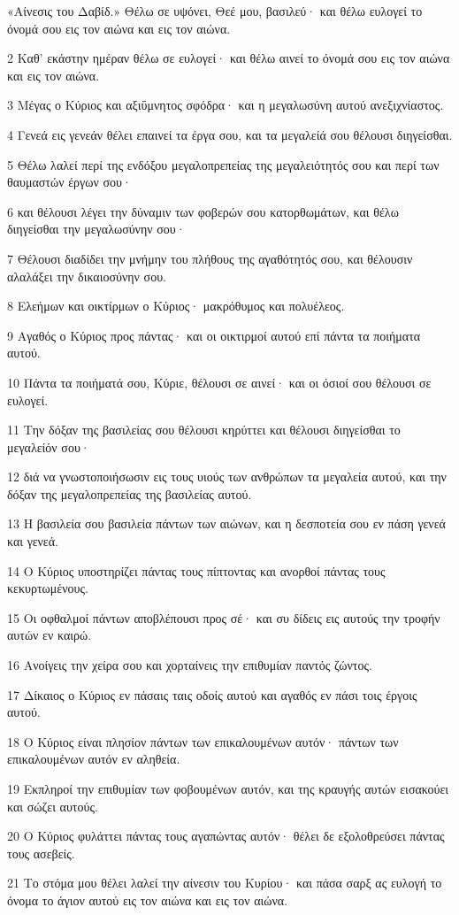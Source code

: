 \par «Αίνεσις του Δαβίδ.» Θέλω σε υψόνει, Θεέ μου, βασιλεύ· και θέλω ευλογεί το όνομά σου εις τον αιώνα και εις τον αιώνα.
\par 2 Καθ' εκάστην ημέραν θέλω σε ευλογεί· και θέλω αινεί το όνομά σου εις τον αιώνα και εις τον αιώνα.
\par 3 Μέγας ο Κύριος και αξιΰμνητος σφόδρα· και η μεγαλωσύνη αυτού ανεξιχνίαστος.
\par 4 Γενεά εις γενεάν θέλει επαινεί τα έργα σου, και τα μεγαλείά σου θέλουσι διηγείσθαι.
\par 5 Θέλω λαλεί περί της ενδόξου μεγαλοπρεπείας της μεγαλειότητός σου και περί των θαυμαστών έργων σου·
\par 6 και θέλουσι λέγει την δύναμιν των φοβερών σου κατορθωμάτων, και θέλω διηγείσθαι την μεγαλωσύνην σου·
\par 7 Θέλουσι διαδίδει την μνήμην του πλήθους της αγαθότητός σου, και θέλουσιν αλαλάξει την δικαιοσύνην σου.
\par 8 Ελεήμων και οικτίρμων ο Κύριος· μακρόθυμος και πολυέλεος.
\par 9 Αγαθός ο Κύριος προς πάντας· και οι οικτιρμοί αυτού επί πάντα τα ποιήματα αυτού.
\par 10 Πάντα τα ποιήματά σου, Κύριε, θέλουσι σε αινεί· και οι όσιοί σου θέλουσι σε ευλογεί.
\par 11 Την δόξαν της βασιλείας σου θέλουσι κηρύττει και θέλουσι διηγείσθαι το μεγαλείόν σου·
\par 12 διά να γνωστοποιήσωσιν εις τους υιούς των ανθρώπων τα μεγαλεία αυτού, και την δόξαν της μεγαλοπρεπείας της βασιλείας αυτού.
\par 13 Η βασιλεία σου βασιλεία πάντων των αιώνων, και η δεσποτεία σου εν πάση γενεά και γενεά.
\par 14 Ο Κύριος υποστηρίζει πάντας τους πίπτοντας και ανορθοί πάντας τους κεκυρτωμένους.
\par 15 Οι οφθαλμοί πάντων αποβλέπουσι προς σέ· και συ δίδεις εις αυτούς την τροφήν αυτών εν καιρώ.
\par 16 Ανοίγεις την χείρα σου και χορταίνεις την επιθυμίαν παντός ζώντος.
\par 17 Δίκαιος ο Κύριος εν πάσαις ταις οδοίς αυτού και αγαθός εν πάσι τοις έργοις αυτού.
\par 18 Ο Κύριος είναι πλησίον πάντων των επικαλουμένων αυτόν· πάντων των επικαλουμένων αυτόν εν αληθεία.
\par 19 Εκπληροί την επιθυμίαν των φοβουμένων αυτόν, και της κραυγής αυτών εισακούει και σώζει αυτούς.
\par 20 Ο Κύριος φυλάττει πάντας τους αγαπώντας αυτόν· θέλει δε εξολοθρεύσει πάντας τους ασεβείς.
\par 21 Το στόμα μου θέλει λαλεί την αίνεσιν του Κυρίου· και πάσα σαρξ ας ευλογή το όνομα το άγιον αυτού εις τον αιώνα και εις τον αιώνα.

